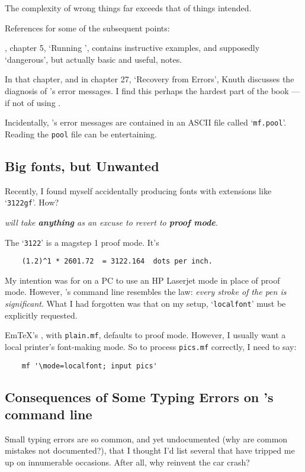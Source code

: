 The complexity of wrong things far exceeds that of things intended.

References for some of the subsequent points:

\MFbook{}, chapter 5, `Running \MF{}', contains
instructive examples, and supposedly `dangerous', but actually basic
and useful, notes.

In that chapter, and in chapter 27, `Recovery from Errors', {\sc Knuth}
discusses the diagnosis of \MF{}'s error messages.  I find this
perhaps the hardest part of the book --- if not of using \MF{}.

Incidentally, \MF{}'s error messages are contained in an ASCII
file called `{\tt mf.pool}'.  Reading the {\tt pool} file can be
entertaining.


\subsection{Big fonts, but Unwanted}\label{sec:proof}

Recently, I found myself accidentally producing fonts with extensions
like `{\tt 3122gf}'.  How?

{\em \MF{} will take {\bf anything} as an excuse to revert
to {\bf proof mode}.}

The `{\tt 3122}' is a magstep 1 proof mode.  It's
\begin{verbatim}
    (1.2)^1 * 2601.72  = 3122.164  dots per inch.
\end{verbatim}

My intention was for \MF{} on a PC to use an HP Laserjet mode in
place of proof mode.  However, \MF{}'s command line resembles
the law:  {\em every stroke of the pen is significant\/}.  What I had
forgotten was that on my setup, `{\tt localfont}' must be explicitly
requested.

Em\TeX{}'s \MF{}, with {\tt plain.mf}, defaults to proof mode.
However, I usually want a local printer's font-making mode.
So to process {\tt pics.mf} correctly, I need to say:
\begin{verbatim}
    mf '\mode=localfont; input pics'
\end{verbatim}


\subsection{Consequences of Some Typing Errors on \MF{}'s
  command line}\label{sub:typo}

Small typing errors are so common, and yet undocumented (why are
common mistakes not documented?), that I thought I'd list several that
have tripped me up on innumerable occasions.  After all, why reinvent
the car crash?

